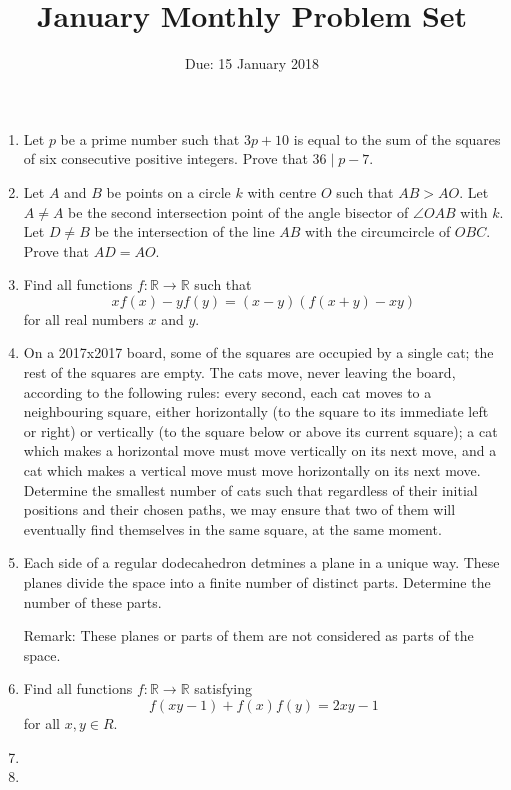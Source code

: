 \documentclass[12pt]{article}
\title{January Monthly Problem Set}
\author{Due: 15 January 2018}
\date{}
\begin{document}
 \maketitle

\begin{enumerate}

\item %
  Let $p$ be a prime number such that $3p+10$ is equal to the sum of the squares of six consecutive positive integers. Prove that $36 \mid p-7$.

 
\item %
Let $A$ and $B$ be points on a circle $k$ with centre $O$ such that $AB > AO$. Let $A \neq A$ be the second intersection point of the angle bisector of $\angle OAB$ with $k$. Let $D \neq B$ be the intersection of the line $AB$ with the circumcircle of $OBC$. Prove that $AD = AO$.


\item %
Find all functions $f : \mathbb{R} \to \mathbb{R}$ such that
  \[ xf(x) - yf(y) = (x - y)(f(x + y) - xy) \]
for all real numbers $x$ and $y$.


\item %
On a 2017x2017 board, some of the squares are occupied by a single cat; the rest of the squares are empty. The cats move, never leaving the board, according to the following rules: every second, each cat moves to a neighbouring square, either horizontally (to the square to its immediate left or right) or vertically (to the square below or above its current square); a cat which makes a horizontal move must move vertically on its next move, and a cat which makes a vertical move must move horizontally on its next move. Determine the smallest number of cats such that regardless of their initial positions and their chosen paths, we may ensure that two of them will eventually find themselves in the same square, at the same moment.


\item %
Each side of a regular dodecahedron detmines a plane in a unique way. These planes divide the space into a finite number of distinct parts. Determine the number of these parts.

\small{Remark: These planes or parts of them are not considered as parts of the space.}


\item %
Find all functions $f: \mathbb{R} \to \mathbb{R}$ satisfying
  \[ f(xy-1) + f(x)f(y) = 2xy-1 \]
for all $x,y\in R$.


\item %


\item %


\end{enumerate}

\vfill

\centering
\begin{BVerbatim}
\end{BVerbatim}
\end{document}
